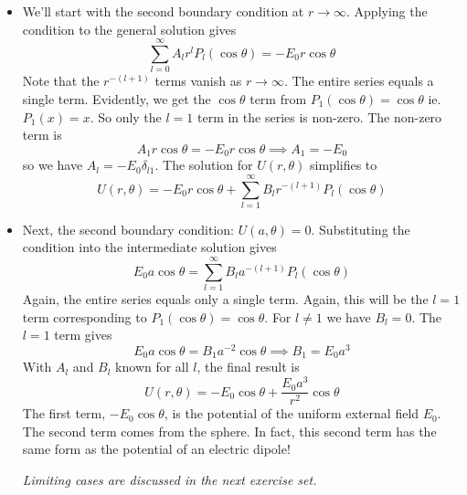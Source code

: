 \documentclass[11pt, a4paper]{article}
\begin{document}
\begin{itemize}
	\item We'll start with the second boundary condition at $ r \to \infty $. Applying the condition to the general solution gives
	\begin{equation*}
		\sum_{l = 0}^{\infty} A_{l}r^{l} P_{l}(\cos \theta) = -E_{0}r \cos \theta
	\end{equation*}
	Note that the $ r^{-(l+1)} $ terms vanish as $ r \to \infty $. The entire series equals a single term. Evidently, we get the $ \cos \theta $ term from $ P_{1}(\cos \theta) = \cos \theta $ ie. $ P_{1}(x) = x $. So only the $ l = 1 $ term in the series is non-zero. The non-zero term is
	\begin{equation*}
		A_{1}r \cos \theta = -E_{0}r \cos \theta \implies A_{1} = - E_{0}
	\end{equation*}
	so we have $ A_{l} = -E_{0}\delta_{l1} $. The solution for $ U(r, \theta) $ simplifies to
	\begin{equation*}
		U(r, \theta) = -E_{0}r \cos \theta + \sum_{l=1}^{\infty} B_{l}r^{-(l+1)}P_{l}(\cos \theta)
	\end{equation*}
	
	\item Next, the second boundary condition: $ U(a, \theta) = 0 $. Substituting the condition into the intermediate solution gives
	\begin{equation*}
		E_{0}a\cos \theta = \sum_{l=1}^{\infty} B_{l}a^{-(l+1)}P_{l}(\cos \theta)
	\end{equation*}
	Again, the entire series equals only a single term. Again, this will be the $ l = 1 $ term corresponding to $ P_{1}(\cos \theta) = \cos \theta $. For $ l \neq 1 $ we have $ B_{l} = 0 $. The $ l = 1 $ term gives
	\begin{equation*}
		E_{0}a\cos \theta = B_{1}a^{-2}\cos \theta \implies B_{1} = E_{0}a^{3}
	\end{equation*}
	With $ A_{l} $ and $ B_{l} $ known for all $ l $, the final result is
	\begin{equation*}
		U(r, \theta) = - E_{0} \cos \theta + \frac{E_{0}a^{3}}{r^{2}}\cos \theta
	\end{equation*}
	The first term, $ - E_{0} \cos \theta $, is the potential of the uniform external field $ E_{0} $. The second term comes from the sphere. In fact, this second term has the same form as the potential of an electric dipole!
	
	\textit{Limiting cases are discussed in the next exercise set.}
\end{itemize}
\end{document}
